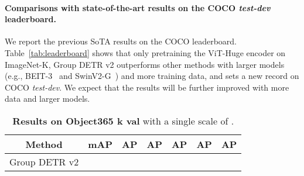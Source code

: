 \documentclass[10pt,twocolumn,letterpaper]{article}
\begin{document}
\paragraph{Comparisons with state-of-the-art results on the COCO {\em test-dev} leaderboard.} 
We report the previous SoTA results on the COCO leaderboard. Table~\ref{tab:leaderboard} shows that only pretraining the ViT-Huge encoder on ImageNet-K, Group DETR v2 outperforms other methods with larger models ({e.g.}, BEIT-3~\cite{wang2022image} and SwinV2-G~\cite{liu2022swin}) and more training data, and sets a new record on COCO {\em test-dev}. 
We expect that the results will be further improved with more data and larger models.

\begin{table}
  \centering
    \setlength{\tabcolsep}{5pt}
    \renewcommand{\arraystretch}{1.3}
    \footnotesize    
  \caption{\textbf{Results on Object365 k val} with a single scale of .}
  \begin{tabular}{c|cccccc}
    \toprule
    Method &  mAP & AP &  AP & AP & AP & AP \\
    \midrule
    Group DETR v2  &  &  &  &  &  &  \\
    \bottomrule
  \end{tabular}
  \label{tab:o365}
\end{table}



{\small


}
\end{document}
